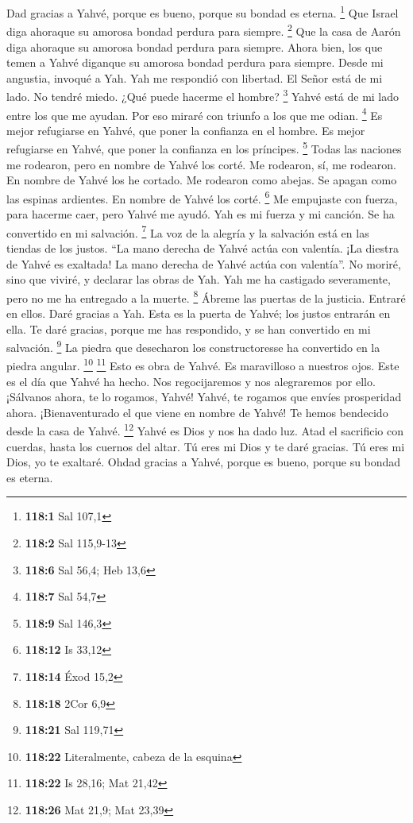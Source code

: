 \begin{paracol}{2}
 Dad gracias a Yahvé, porque es bueno, porque su bondad es
eterna. \footnote{\textbf{118:1} Sal 107,1}  Que Israel
diga ahoraque su amorosa bondad perdura para siempre. \footnote{\textbf{118:2}
  Sal 115,9-13}  Que la casa de Aarón diga ahoraque su
amorosa bondad perdura para siempre.  Ahora bien, los que
temen a Yahvé diganque su amorosa bondad perdura para siempre.
 Desde mi angustia, invoqué a Yah. Yah me respondió con
libertad.  El Señor está de mi lado. No tendré miedo. ¿Qué
puede hacerme el hombre? \footnote{\textbf{118:6} Sal 56,4; Heb 13,6}
 Yahvé está de mi lado entre los que me ayudan. Por eso
miraré con triunfo a los que me odian. \footnote{\textbf{118:7} Sal 54,7}
 Es mejor refugiarse en Yahvé, que poner la confianza en
el hombre.  Es mejor refugiarse en Yahvé, que poner la
confianza en los príncipes. \footnote{\textbf{118:9} Sal 146,3}
 Todas las naciones me rodearon, pero en nombre de Yahvé
los corté.  Me rodearon, sí, me rodearon. En nombre de
Yahvé los he cortado.  Me rodearon como abejas. Se apagan
como las espinas ardientes. En nombre de Yahvé los corté. \footnote{\textbf{118:12}
  Is 33,12}  Me empujaste con fuerza, para hacerme caer,
pero Yahvé me ayudó.  Yah es mi fuerza y mi canción. Se
ha convertido en mi salvación. \footnote{\textbf{118:14} Éxod 15,2}
 La voz de la alegría y la salvación está en las tiendas
de los justos. ``La mano derecha de Yahvé actúa con valentía.
 ¡La diestra de Yahvé es exaltada! La mano derecha de
Yahvé actúa con valentía''.  No moriré, sino que viviré,
y declarar las obras de Yah.  Yah me ha castigado
severamente, pero no me ha entregado a la muerte. \footnote{\textbf{118:18}
  2Cor 6,9}  Ábreme las puertas de la justicia. Entraré
en ellos. Daré gracias a Yah.  Esta es la puerta de
Yahvé; los justos entrarán en ella.  Te daré gracias,
porque me has respondido, y se han convertido en mi salvación.
\footnote{\textbf{118:21} Sal 119,71}  La piedra que
desecharon los constructoresse ha convertido en la piedra angular.
\footnote{\textbf{118:22} Literalmente, cabeza de la esquina}
\footnote{\textbf{118:22} Is 28,16; Mat 21,42}  Esto es
obra de Yahvé. Es maravilloso a nuestros ojos.  Este es
el día que Yahvé ha hecho. Nos regocijaremos y nos alegraremos por ello.
 ¡Sálvanos ahora, te lo rogamos, Yahvé! Yahvé, te rogamos
que envíes prosperidad ahora.  ¡Bienaventurado el que
viene en nombre de Yahvé! Te hemos bendecido desde la casa de Yahvé.
\footnote{\textbf{118:26} Mat 21,9; Mat 23,39}  Yahvé es
Dios y nos ha dado luz. Atad el sacrificio con cuerdas, hasta los
cuernos del altar.  Tú eres mi Dios y te daré gracias. Tú
eres mi Dios, yo te exaltaré.  Ohdad gracias a Yahvé,
porque es bueno, porque su bondad es eterna.


\end{paracol}
